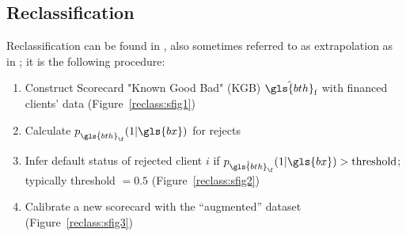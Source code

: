 \subsection{Reclassification} \label{reclassification}

Reclassification can be found in \cite{RI6}, also sometimes referred to as extrapolation as in \cite{banasik}; it is the following procedure:
\begin{enumerate}
\item Construct Scorecard "Known Good Bad" (KGB) $\hat{\gls{bth}}_{\text{f}}$ with financed clients' data (Figure~\ref{reclass:sfig1})
\item Calculate $p_{\hat{\gls{bth}}_{\f}}(1|\gls{bx})$ for rejects
\item Infer default status of rejected client $i$ if $p_{\hat{\gls{bth}}_{\f}}(1|\gls{bx}) > \text{threshold}$; typically threshold $=0.5$ (Figure~\ref{reclass:sfig2})
\item Calibrate a new scorecard with the ``augmented'' dataset (Figure~\ref{reclass:sfig3})
\end{enumerate}

